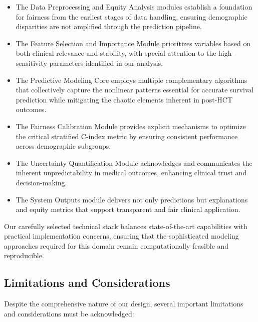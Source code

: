 \begin{itemize}
    \item The Data Preprocessing and Equity Analysis modules establish a foundation for fairness from the earliest stages of data handling, ensuring demographic disparities are not amplified through the prediction pipeline.
    
    \item The Feature Selection and Importance Module prioritizes variables based on both clinical relevance and stability, with special attention to the high-sensitivity parameters identified in our analysis.
    
    \item The Predictive Modeling Core employs multiple complementary algorithms that collectively capture the nonlinear patterns essential for accurate survival prediction while mitigating the chaotic elements inherent in post-HCT outcomes.
    
    \item The Fairness Calibration Module provides explicit mechanisms to optimize the critical stratified C-index metric by ensuring consistent performance across demographic subgroups.
    
    \item The Uncertainty Quantification Module acknowledges and communicates the inherent unpredictability in medical outcomes, enhancing clinical trust and decision-making.
    
    \item The System Outputs module delivers not only predictions but explanations and equity metrics that support transparent and fair clinical application.
\end{itemize}

Our carefully selected technical stack balances state-of-the-art capabilities with practical implementation concerns, ensuring that the sophisticated modeling approaches required for this domain remain computationally feasible and reproducible.

\subsection{Limitations and Considerations}

Despite the comprehensive nature of our design, several important limitations and considerations must be acknowledged:

